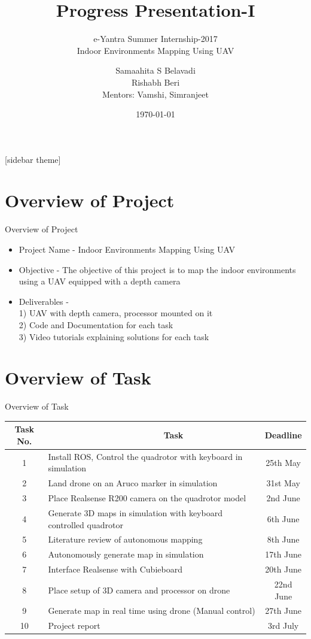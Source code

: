 \documentclass[10pt, a4paper]{beamer}
\begin{document}
	\title{Progress Presentation-I}
	\subtitle{e-Yantra Summer Internship-2017 \\ Indoor Environments Mapping Using UAV}
	\author{Samaahita S Belavadi\\Rishabh Beri\\
	Mentors: Vamshi, Simranjeet}
	\date{\today}
	\frame{\titlepage}

[sidebar theme]
\section{Overview of Project}
\begin{frame}{Overview of Project}
	\begin{itemize}
		\item Project Name - Indoor Environments Mapping Using UAV
		\item Objective - The objective of this project is to map the indoor environments using a UAV equipped with a depth camera
		\item Deliverables -\\
		1) UAV with depth camera, processor mounted on it\\
		2) Code and Documentation for each task\\
		3) Video tutorials explaining solutions for each task
	\end{itemize}
\end{frame}

\section{Overview of Task}
\begin{frame}{Overview of Task}
\begin{tabular}{| c | p{6.5cm} | c | }
\hline
Task No. & ~~~~~~~~~~~~~~~~~~~~~~~~Task & Deadline\\
\hline
  1 & Install ROS, Control the quadrotor with keyboard in simulation & 25th May\\
\hline
2 & Land drone on an Aruco marker in simulation & 31st May\\
\hline
3 & Place Realsense R200 camera on the quadrotor model & 2nd June\\
\hline
4 & Generate 3D maps in simulation with keyboard controlled quadrotor & 6th June\\
\hline
5 & Literature review of autonomous mapping & 8th June\\
\hline
6 & Autonomously generate map in simulation & 17th June\\
\hline
7 & Interface Realsense with Cubieboard & 20th June\\
\hline
8 & Place setup of 3D camera and processor on drone & 22nd June\\
\hline
9 & Generate map in real time using drone (Manual control) & 27th June\\
\hline
10 & Project report & 3rd July\\
\hline
\end{tabular}
\end{frame}
\end{document}
